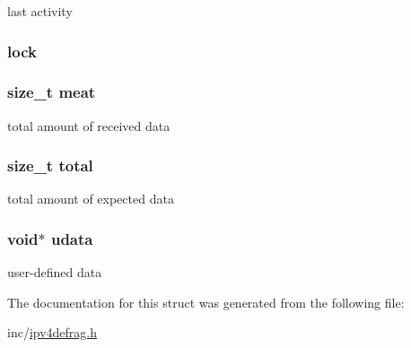 last activity 

\hypertarget{structntoh__ipv4__flow__t_aad15823e4f2835531e6a02321cd53f7e}{
\subsubsection[{lock}]{ lock}}\label{structntoh__ipv4__flow__t_aad15823e4f2835531e6a02321cd53f7e}
\hypertarget{structntoh__ipv4__flow__t_a25cdc91a1ce3b46649beaacf6315dee7}{
\subsubsection[{meat}]{\setlength{\rightskip}{0pt plus 5cm}size\-\_\-t meat}}\label{structntoh__ipv4__flow__t_a25cdc91a1ce3b46649beaacf6315dee7}


total amount of received data 

\hypertarget{structntoh__ipv4__flow__t_a3fab45bb4d7cd7e889bdf00080096e8e}{
\subsubsection[{total}]{\setlength{\rightskip}{0pt plus 5cm}size\-\_\-t total}}\label{structntoh__ipv4__flow__t_a3fab45bb4d7cd7e889bdf00080096e8e}


total amount of expected data 

\hypertarget{structntoh__ipv4__flow__t_a697ce711b67313990d351b5c95f87aed}{
\subsubsection[{udata}]{\setlength{\rightskip}{0pt plus 5cm}void$\ast$ udata}}\label{structntoh__ipv4__flow__t_a697ce711b67313990d351b5c95f87aed}


user-\/defined data 



The documentation for this struct was generated from the following file\-:\begin{DoxyCompactItemize}
\item 
inc/\hyperlink{ipv4defrag_8h}{ipv4defrag.\-h}\end{DoxyCompactItemize}
